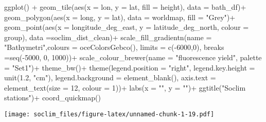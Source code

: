 \documentclass[
]{article}
\newenvironment{Shaded}{\begin{snugshade}}{\end{snugshade}}
\newcommand{\AttributeTok}[1]{\textcolor[rgb]{0.77,0.63,0.00}{#1}}
\newcommand{\DecValTok}[1]{\textcolor[rgb]{0.00,0.00,0.81}{#1}}
\newcommand{\FloatTok}[1]{\textcolor[rgb]{0.00,0.00,0.81}{#1}}
\newcommand{\FunctionTok}[1]{\textcolor[rgb]{0.00,0.00,0.00}{#1}}
\newcommand{\NormalTok}[1]{#1}
\newcommand{\SpecialCharTok}[1]{\textcolor[rgb]{0.00,0.00,0.00}{#1}}
\newcommand{\StringTok}[1]{\textcolor[rgb]{0.31,0.60,0.02}{#1}}
\begin{document}
\begin{Shaded}
\begin{Highlighting}[]
\FunctionTok{ggplot}\NormalTok{() }\SpecialCharTok{+}
  \FunctionTok{geom\_tile}\NormalTok{(}\FunctionTok{aes}\NormalTok{(}\AttributeTok{x =}\NormalTok{ lon, }\AttributeTok{y =}\NormalTok{ lat, }\AttributeTok{fill =}\NormalTok{ height), }\AttributeTok{data =}\NormalTok{ bath\_df)}\SpecialCharTok{+}
  \FunctionTok{geom\_polygon}\NormalTok{(}\FunctionTok{aes}\NormalTok{(}\AttributeTok{x =}\NormalTok{ long, }\AttributeTok{y =}\NormalTok{ lat), }\AttributeTok{data =}\NormalTok{ worldmap, }\AttributeTok{fill =} \StringTok{"Grey"}\NormalTok{)}\SpecialCharTok{+}
  \FunctionTok{geom\_point}\NormalTok{(}\FunctionTok{aes}\NormalTok{(}\AttributeTok{x =}\NormalTok{ longitude\_deg\_east, }\AttributeTok{y =}\NormalTok{ latitude\_deg\_north, }\AttributeTok{colour =}\NormalTok{ group), }\AttributeTok{data =}\NormalTok{soclim\_dist\_clean)}\SpecialCharTok{+}
  \FunctionTok{scale\_fill\_gradientn}\NormalTok{(}\AttributeTok{name =} \StringTok{"Bathymetri"}\NormalTok{,}\AttributeTok{colours =} \FunctionTok{oceColorsGebco}\NormalTok{(),}
                       \AttributeTok{limits =} \FunctionTok{c}\NormalTok{(}\SpecialCharTok{{-}}\DecValTok{6000}\NormalTok{,}\DecValTok{0}\NormalTok{), }\AttributeTok{breaks =}\FunctionTok{seq}\NormalTok{(}\SpecialCharTok{{-}}\DecValTok{5000}\NormalTok{, }\DecValTok{0}\NormalTok{, }\DecValTok{1000}\NormalTok{))}\SpecialCharTok{+}
  \FunctionTok{scale\_colour\_brewer}\NormalTok{(}\AttributeTok{name =} \StringTok{"fluorescence yield"}\NormalTok{, }\AttributeTok{palette =} \StringTok{"Set1"}\NormalTok{)}\SpecialCharTok{+}
  \FunctionTok{theme\_bw}\NormalTok{()}\SpecialCharTok{+}
  \FunctionTok{theme}\NormalTok{(}\AttributeTok{legend.position =} \StringTok{"right"}\NormalTok{,}
        \AttributeTok{legend.key.height =} \FunctionTok{unit}\NormalTok{(}\FloatTok{1.2}\NormalTok{, }\StringTok{"cm"}\NormalTok{), }
        \AttributeTok{legend.background =} \FunctionTok{element\_blank}\NormalTok{(),}
        \AttributeTok{axis.text =} \FunctionTok{element\_text}\NormalTok{(}\AttributeTok{size =} \DecValTok{12}\NormalTok{, }\AttributeTok{colour =} \DecValTok{1}\NormalTok{))}\SpecialCharTok{+}
  \FunctionTok{labs}\NormalTok{(}\AttributeTok{x =} \StringTok{""}\NormalTok{, }\AttributeTok{y =} \StringTok{""}\NormalTok{)}\SpecialCharTok{+}
  \FunctionTok{ggtitle}\NormalTok{(}\StringTok{"Soclim stations"}\NormalTok{)}\SpecialCharTok{+}
  \FunctionTok{coord\_quickmap}\NormalTok{()}
\end{Highlighting}
\end{Shaded}

\texttt{[image: soclim\_files/figure-latex/unnamed-chunk-1-19.pdf]}
\end{document}

